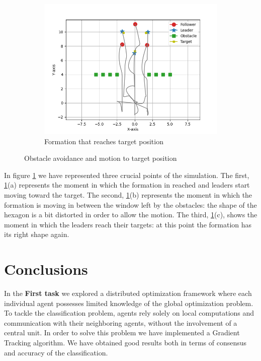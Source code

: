 \documentclass[a4paper,11pt,oneside]{book}
\begin{document}
\begin{figure}[h]
\begin{subfigure}{0.5\textwidth}
	\includegraphics[width=\textwidth]{Hexagon_obstacle_target.jpg}
	\caption{Formation that reaches target position}
	\end{subfigure}
\caption{Obstacle avoidance and motion to target position}
\label{obstacle}
\end{figure}

In figure \ref{obstacle} we have represented three crucial points of the simulation. The first, \ref{obstacle}(a) represents the moment in which the formation in reached and leaders start moving toward the target. The second, \ref{obstacle}(b) represents the moment in which the formation is moving in between the window left by the obstacles: the shape of the hexagon is a bit distorted in order to allow the motion. The third, \ref{obstacle}(c), shows the moment in which the leaders reach their targets: at this point the formation has its right shape again.




\chapter*{Conclusions}
In the \textbf{First task} we explored a distributed optimization framework where each individual agent possesses limited knowledge of the global optimization problem. To tackle the classification problem, agents rely solely on local computations and communication with their neighboring agents, without the involvement of a central unit. In order to solve this problem we have implemented a Gradient Tracking algorithm. 
We have obtained good results both in terms of consensus and accuracy of the classification. 
\end{document}
